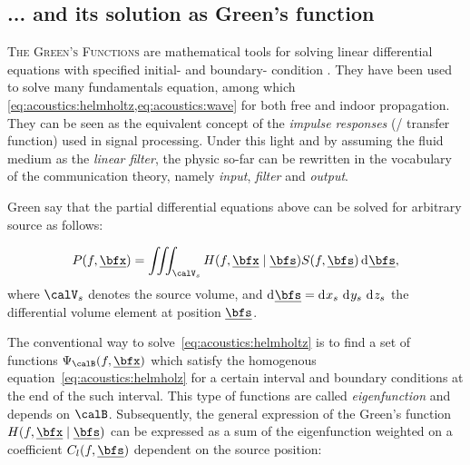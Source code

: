 \subsection{... and its solution as Green's function}
\textsc{The Green's Functions} are mathematical tools for solving linear differential equations with specified initial- and boundary- condition \cite{Duffy2015}.
They have been used to solve many fundamentals equation, among which \cref{eq:acoustics:helmholtz,eq:acoustics:wave} for both free and indoor propagation.
They can be seen as the equivalent concept of the \textit{impulse responses} (\resp/ transfer function) used in signal processing.
Under this light and by assuming the fluid  medium as the \textit{linear filter}, the physic so-far can be rewritten in the vocabulary of
the communication theory, namely \textit{input}, \textit{filter} and \textit{output}.

Green say that the partial differential equations above can be solved for arbitrary source as follows:

\begin{equation}
    \label{eq:acoustics:helmholz_conv}
    P(f, \positionMicrophone) = \iiint_{\volume_\contSource} H(f, \positionMicrophone \mid \positionSource) S(f, \positionSource) \kdiff\positionSource
    ,
\end{equation}
where $\volume_\contSource$ denotes the source volume,
and  $\kdiff\positionSource =  \kdiff{x_\contSource}\,\kdiff{y_\contSource}\,\kdiff{z_\contSource}$ the  differential  volume element at position $\positionSource$.

The conventional way to solve~\cref{eq:acoustics:helmholtz} is to find a set of functions $\Psi_\boundariesConditions(f, \positionMicrophone)$ which
satisfy the homogenous equation~\cref{eq:acoustics:helmholz} for a certain interval and boundary conditions at the end of the such interval.
This type of functions are called \textit{eigenfunction} and depends on $\boundariesConditions$.
Subsequently, the general expression of the Green's function $H(f, \positionMicrophone \mid \positionSource)$ can be expressed as a sum of the eigenfunction weighted on
a coefficient $C_l(f, \positionSource)$ dependent on the source position:

